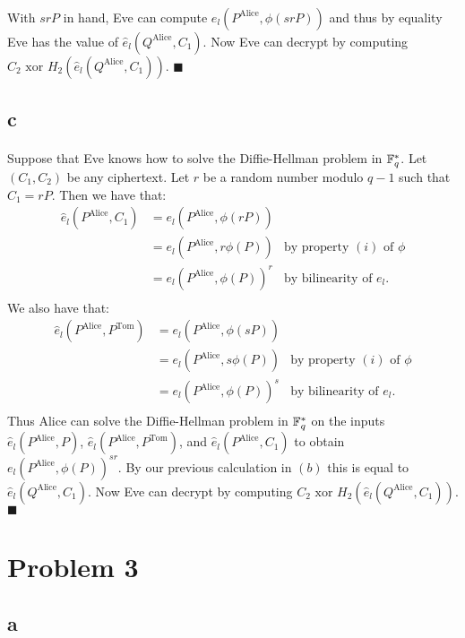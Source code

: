 \documentclass[letterpaper,12pt,oneside,onecolumn]{article}
\begin{document}
\paragraph{}
With $srP$ in hand, Eve can compute $e_l(P^\text{Alice},\phi(srP))$ and thus by equality Eve has the value of $\hat{e}_l (Q^\text{Alice}, C_1)$. Now Eve can decrypt by computing $C_2 \text{ xor } H_2(\hat{e}_l(Q^{\text{Alice}}, C_1))$. $\blacksquare$
\subsection*{c}
\paragraph{}
Suppose that Eve knows how to solve the Diffie-Hellman problem in $\mathbb{F}_q^*$. Let $(C_1, C_2)$ be any ciphertext. Let $r$ be a random number modulo $q-1$ such that $C_1 = rP$. Then we have that:
\begin{align*}
\hat{e}_l(P^\text{Alice}, C_1) &= e_l(P^\text{Alice}, \phi(rP)) \\
&= e_l(P^\text{Alice}, r\phi(P)) &\text{by property $(i)$ of $\phi$}\\
&= e_l(P^\text{Alice}, \phi(P))^r &\text{by bilinearity of $e_l$}. \\
\end{align*}
We also have that:
\begin{align*}
\hat{e}_l(P^\text{Alice}, P^\text{Tom}) &= e_l(P^\text{Alice}, \phi(sP)) \\
&= e_l(P^\text{Alice}, s\phi(P)) &\text{by property $(i)$ of $\phi$}\\
&= e_l(P^\text{Alice}, \phi(P))^s &\text{by bilinearity of $e_l$}. \\
\end{align*}
Thus Alice can solve the Diffie-Hellman problem in $\mathbb{F}_q^*$ on the inputs $\hat{e}_l(P^\text{Alice}, P)$, $\hat{e}_l(P^\text{Alice}, P^\text{Tom})$, and $\hat{e}_l(P^\text{Alice}, C_1)$ to obtain $e_l(P^\text{Alice}, \phi(P))^{sr}$. By our previous calculation in $(b)$ this is equal to $\hat{e}_l(Q^\text{Alice},C_1)$. Now Eve can decrypt by computing $C_2 \text{ xor } H_2(\hat{e}_l(Q^{\text{Alice}}, C_1))$. $\blacksquare$
\section*{Problem 3}
\subsection*{a}
\end{document}
